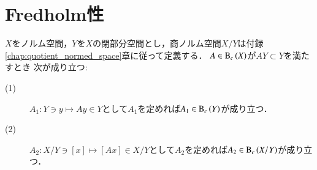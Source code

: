 \section{Fredholm性}
	
	\begin{screen}
		\begin{thm}[商空間のコンパクト作用素]
			$X$をノルム空間，$Y$を$X$の閉部分空間とし，商ノルム空間$X/Y$は付録\ref{chap:quotient_normed_space}章に従って定義する．
			$A \in \mathrm{B}_c\left(X\right) $が$AY \subset Y$を満たすとき
			次が成り立つ:
			\begin{description}
				\item[(1)] $A_1:Y \ni y \longmapsto A y \in Y$として$A_1$を定めれば$A_1 \in \mathrm{B}_c\left(Y\right) $が成り立つ．
				\item[(2)] $A_2:X/Y \ni [x] \longmapsto [Ax] \in X/Y$として$A_2$を定めれば$A_2 \in \mathrm{B}_c\left(X/Y\right) $が成り立つ．
			\end{description}
		\end{thm}
	\end{screen}
	
